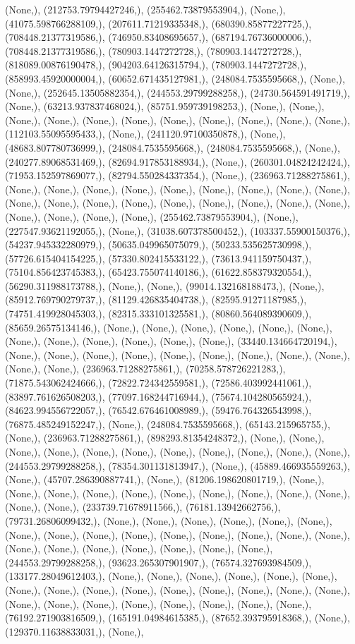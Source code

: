 \documentclass{article}
\begin{document}
(None,), (212753.79794427246,), (255462.73879553904,), (None,), (41075.598766288109,), (207611.71219335348,), (680390.85877227725,), (708448.21377319586,), (746950.83408695657,), (687194.76736000006,), (708448.21377319586,), (780903.1447272728,), (780903.1447272728,), (818089.00876190478,), (904203.64126315794,), (780903.1447272728,), (858993.45920000004,), (60652.671435127981,), (248084.7535595668,), (None,), (None,), (252645.13505882354,), (244553.29799288258,), (24730.564591491719,), (None,), (63213.937837468024,), (85751.959739198253,), (None,), (None,), (None,), (None,), (None,), (None,), (None,), (None,), (None,), (None,), (None,), (112103.55095595433,), (None,), (241120.97100350878,), (None,), (48683.807780736999,), (248084.7535595668,), (248084.7535595668,), (None,), (240277.89068531469,), (82694.917853188934,), (None,), (260301.04824242424,), (71953.152597869077,), (82794.550284337354,), (None,), (236963.71288275861,), (None,), (None,), (None,), (None,), (None,), (None,), (None,), (None,), (None,), (None,), (None,), (None,), (None,), (None,), (None,), (None,), (None,), (None,), (None,), (None,), (None,), (None,), (255462.73879553904,), (None,), (227547.93621192055,), (None,), (31038.607378500452,), (103337.55900150376,), (54237.945332280979,), (50635.049965075079,), (50233.535625730998,), (57726.615404154225,), (57330.802415533122,), (73613.941159750437,), (75104.856423745383,), (65423.755074140186,), (61622.858379320554,), (56290.311988173788,), (None,), (None,), (99014.132168188473,), (None,), (85912.769790279737,), (81129.426835404738,), (82595.91271187985,), (74751.419928045303,), (82315.333101325581,), (80860.564089390609,), (85659.26575134146,), (None,), (None,), (None,), (None,), (None,), (None,), (None,), (None,), (None,), (None,), (None,), (None,), (33440.134664720194,), (None,), (None,), (None,), (None,), (None,), (None,), (None,), (None,), (None,), (None,), (None,), (236963.71288275861,), (70258.578726221283,), (71875.543062424666,), (72822.724342559581,), (72586.403992441061,), (83897.761626508203,), (77097.168244716944,), (75674.104280565924,), (84623.994556722057,), (76542.676461008989,), (59476.764326543998,), (76875.485249152247,), (None,), (248084.7535595668,), (65143.215965755,), (None,), (236963.71288275861,), (898293.81354248372,), (None,), (None,), (None,), (None,), (None,), (None,), (None,), (None,), (None,), (None,), (None,), (244553.29799288258,), (78354.301131813947,), (None,), (45889.466935559263,), (None,), (45707.286390887741,), (None,), (81206.198620801719,), (None,), (None,), (None,), (None,), (None,), (None,), (None,), (None,), (None,), (None,), (None,), (None,), (233739.71678911566,), (76181.13942662756,), (79731.26806099432,), (None,), (None,), (None,), (None,), (None,), (None,), (None,), (None,), (None,), (None,), (None,), (None,), (None,), (None,), (None,), (None,), (None,), (None,), (None,), (None,), (None,), (None,), (244553.29799288258,), (93623.265307901907,), (76574.327693984509,), (133177.28049612403,), (None,), (None,), (None,), (None,), (None,), (None,), (None,), (None,), (None,), (None,), (None,), (None,), (None,), (None,), (None,), (None,), (None,), (None,), (None,), (None,), (None,), (None,), (None,), (76192.271903816509,), (165191.04984615385,), (87652.393795918368,), (None,), (129370.11638833031,), (None,), 
\end{document}
